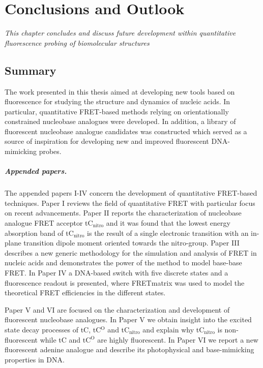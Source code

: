 \chapter{Conclusions and Outlook}
\label{chap:Methodologies}
\textit{This chapter concludes and discuss future development within quantitative fluorescence probing of biomolecular structures}
\vspace{2ex}\vfill
\minitoc
\newpage

\section{Summary}
 The work presented in this thesis aimed at developing new tools based on fluorescence for studying the structure and dynamics of nucleic acids. In particular, quantitative FRET-based methods relying on orientationally constrained nucleobase analogues were developed. In addition, a library of fluorescent nucleobase analogue candidates was constructed which served as a source of inspiration for developing new and improved fluorescent DNA-mimicking probes.

 \paragraph{Appended papers.} The appended papers I-IV concern the development of quantitative FRET-based techniques. Paper I reviews the field of quantitative FRET with particular focus on recent advancements. Paper II reports the characterization of nucleobase analogue FRET acceptor tC$_\mathrm{nitro}$ and it was found that the lowest energy absorption band of tC$_\mathrm{nitro}$ is the result of a single electronic transition with an in-plane transition dipole moment oriented towards the nitro-group. Paper III describes a new generic methodology for the simulation and analysis of FRET in nucleic acids and demonstrates the power of the method to model base-base FRET. In Paper IV a DNA-based switch with five discrete states and a fluorescence readout is presented, where FRETmatrix was used to model the theoretical FRET efficiencies in the different states.

 Paper V and VI are focused on the characterization and development of fluorescent nucleobase analogues. In Paper V we obtain insight into the excited state decay processes of tC, tC$^\mathrm{O}$ and tC$_\mathrm{nitro}$ and explain why tC$_\mathrm{nitro}$ is non-fluorescent while tC and tC$^\mathrm{O}$ are highly fluorescent. In Paper VI we report a new fluorescent adenine analogue and describe its photophysical and base-mimicking properties in DNA.

